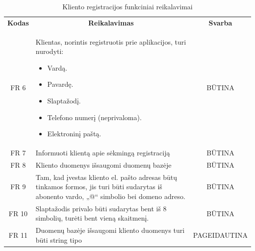 \documentclass{VUMIFPSkursinis}
\begin{document}
{{{{{\begin{center}
	\begin{table}[H]
	\caption{Kliento registracijos funkciniai reikalavimai}
	\begin{tabular}{|p{2cm}|p{}|p{}|}
	\hline
	    \rowcolor{lightgray}
		\multicolumn{3}{|c|}{Kliento registracija}\\
		
	\hline
		\multicolumn{1}{|c|}{{\bfseries Kodas}}&
		\multicolumn{1}{|c|}{{\bfseries Reikalavimas}}&
		\multicolumn{1}{|c|}{{\bfseries Svarba}}\\

	\hline
	\multicolumn{1}{|c|}{FR 6}&
	{Klientas, norintis registruotis prie aplikacijos, turi nurodyti:
		\begin{itemize}
			\item Vardą.
			\item Pavardę.
			\item Slaptažodį.
			\item Telefono numerį (neprivaloma).
			\item Elektroninį paštą.
		\end{itemize}}&		
	\multicolumn{1}{|c|}{BŪTINA}\\
	\hline
	
		\multicolumn{1}{|c|}{FR 7}&
		{Informuoti klientą apie sėkmingą registraciją}&
		\multicolumn{1}{|c|}{BŪTINA}\\	
	\hline
		\multicolumn{1}{|c|}{FR 8}&
		{Kliento duomenys išsaugomi duomenų bazėje}&
		\multicolumn{1}{|c|}{BŪTINA}\\	
	\hline	
		\multicolumn{1}{|c|}{FR 9}&
		{Tam, kad įvestas kliento el. pašto adresas būtų tinkamos formos, jis turi būti sudarytas iš abonento vardo, „@“ simbolio bei domeno adreso.}&
		\multicolumn{1}{|c|}{BŪTINA}\\	
	\hline
		\multicolumn{1}{|c|}{FR 10}&
		{Slaptažodis privalo būti sudarytas bent iš 8 simbolių, turėti bent vieną skaitmenį.
}&
		\multicolumn{1}{|c|}{BŪTINA}\\		
	\hline
		\multicolumn{1}{|c|}{FR 11}&
		{Duomenų bazėje išsaugomi kliento duomenys turi būti string tipo }&
		\multicolumn{1}{|p{1.5cm}|}{PAGEIDAUTINA}\\		
	\hline
	
	\end{tabular}
	
	\label{table:VartotojoRegistracija}
	\end{table}

\end{center}

}}}}}
\end{document}
